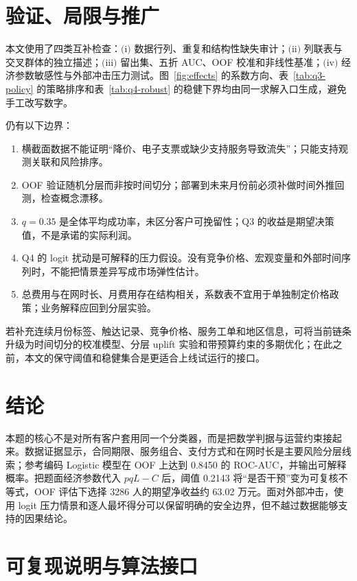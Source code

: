 \documentclass[UTF8,a4paper,11pt]{ctexart}
\begin{document}
\section{验证、局限与推广}\label{sec:validation}

本文使用了四类互补检查：\(\text{(i)}\) 数据行列、重复和结构性缺失审计；\(\text{(ii)}\) 列联表与交叉群体的独立描述；\(\text{(iii)}\) 留出集、五折 AUC、OOF 校准和非线性基准；\(\text{(iv)}\) 经济参数敏感性与外部冲击压力测试。图~\ref{fig:effects} 的系数方向、表~\ref{tab:q3-policy} 的策略排序和表~\ref{tab:q4-robust} 的稳健下界均由同一求解入口生成，避免手工改写数字。

仍有以下边界：
\begin{enumerate}[label=\arabic*.,leftmargin=2.5em]
  \item 横截面数据不能证明“降价、电子支票或缺少支持服务导致流失”；只能支持观测关联和风险排序。
  \item OOF 验证随机分层而非按时间切分；部署到未来月份前必须补做时间外推回测，检查概念漂移。
  \item \(q=0.35\) 是全体平均成功率，未区分客户可挽留性；Q3 的收益是期望决策值，不是承诺的实际利润。
  \item Q4 的 logit 扰动是可解释的压力假设。没有竞争价格、宏观变量和外部时间序列时，不能把情景差异写成市场弹性估计。
  \item 总费用与在网时长、月费用存在结构相关，系数表不宜用于单独制定价格政策；业务解释应回到分层实验。
\end{enumerate}

若补充连续月份标签、触达记录、竞争价格、服务工单和地区信息，可将当前链条升级为时间切分的校准模型、分层 uplift 实验和带预算约束的多期优化；在此之前，本文的保守阈值和稳健集合是更适合上线试运行的接口。

\section{结论}\label{sec:conclusion}

本题的核心不是对所有客户套用同一个分类器，而是把数学判据与运营约束接起来。数据证据显示，合同期限、服务组合、支付方式和在网时长是主要风险分层线索；参考编码 Logistic 模型在 OOF 上达到 0.8450 的 ROC-AUC，并输出可解释概率。把题面经济参数代入 \(p q L-C\) 后，阈值 0.2143 将“是否干预”变为可复核不等式，OOF 评估下选择 3286 人的期望净收益约 63.02 万元。面对外部冲击，使用 logit 压力情景和逐人最坏得分可以保留明确的安全边界，但不越过数据能够支持的因果结论。

\appendix
\section{可复现说明与算法接口}\label{app:repro}
\end{document}
